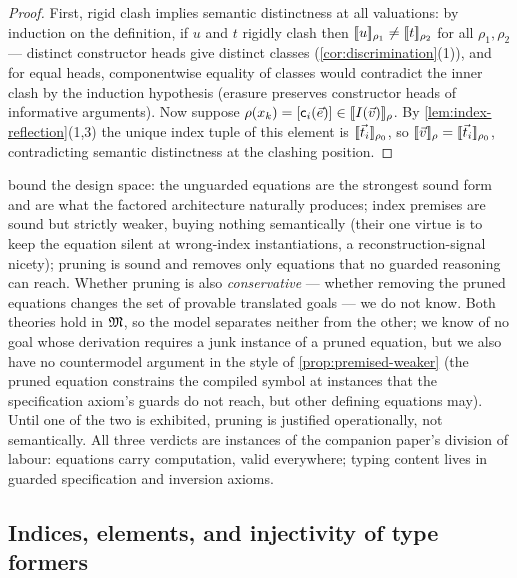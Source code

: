 \begin{proof}
First, rigid clash implies semantic distinctness at all valuations: by
induction on the definition, if $u$ and $t$ rigidly clash then
$[\![ u ]\!]_{\rho_1} \neq [\![ t ]\!]_{\rho_2}$ for all $\rho_1, \rho_2$ ---
distinct constructor heads give distinct classes
(\cref{cor:discrimination}(1)), and for equal heads, componentwise
equality of classes would contradict the inner clash by the induction
hypothesis (erasure preserves constructor heads of informative
arguments).  Now suppose $\rho(x_k) = [\mathsf{c}_i(\vec{e})] \in
[\![ I(\vec{v}) ]\!]_{\rho}$.  By \cref{lem:index-reflection}(1,3) the
unique index tuple of this element is $[\![ \vec{t}_i ]\!]_{\rho_0}$, so
$[\![ \vec{v} ]\!]_\rho = [\![ \vec{t}_i ]\!]_{\rho_0}$, contradicting semantic
distinctness at the clashing position.
\end{proof}

\begin{remark}
\label{rem:equation-choice}
 bound the
design space: the unguarded equations are the strongest sound form and
are what the factored architecture naturally produces; index premises
are sound but strictly weaker, buying nothing semantically (their one
virtue is to keep the equation silent at wrong-index instantiations,
a reconstruction-signal nicety); pruning is sound and removes only
equations that no guarded reasoning can reach.  Whether pruning is
also \emph{conservative} --- whether removing the pruned equations
changes the set of provable translated goals --- we do not know.  Both
theories hold in $\mathfrak{M}$, so the model separates neither from the other;
we know of no goal whose derivation requires a junk instance of a
pruned equation, but we also have no countermodel argument in the
style of \cref{prop:premised-weaker} (the pruned equation constrains
the compiled symbol at instances that the specification axiom's guards
do not reach, but other defining equations may).  Until one of the two
is exhibited, pruning is justified operationally, not semantically.
All three verdicts are instances of the companion paper's division of
labour: equations carry computation, valid everywhere; typing content
lives in guarded specification and inversion axioms.
\end{remark}

\subsection{Indices, elements, and injectivity of type formers}
\label{sec:formulas-injectivity}


